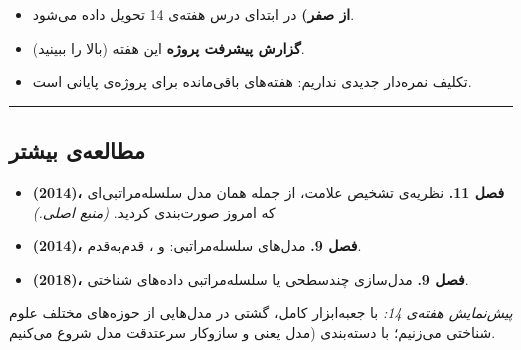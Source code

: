 \begin{itemize}
\tightlist
\item
  \textbf{ از صفر)} در ابتدای درس هفته‌ی 14 تحویل داده
  می‌شود.
\item
  \textbf{گزارش پیشرفت پروژه} این هفته (بالا را ببینید).
\item
  تکلیف نمره‌دار جدیدی نداریم: هفته‌های باقی‌مانده برای پروژه‌ی پایانی است.
\end{itemize}

\begin{center}\rule{0.5\linewidth}{0.5pt}\end{center}

\subsection{مطالعه‌ی بیشتر}

\begin{itemize}
\tightlist
\item
  \textbf{ \lr{\&}  (2014)، فصل 11.} نظریه‌ی تشخیص
  علامت، از جمله همان مدل  سلسله‌مراتبی‌ای که امروز صورت‌بندی
  کردید. \emph{(منبع اصلی.)}
\item
  \textbf{ (2014)، فصل 9.} مدل‌های سلسله‌مراتبی:  و ، قدم‌به‌قدم.
\item
  \textbf{ \lr{\&}  (2018)، فصل 9.} مدل‌سازی
  چندسطحی یا سلسله‌مراتبی داده‌های شناختی.
\end{itemize}

\emph{پیش‌نمایش هفته‌ی 14:} با جعبه‌ابزار کامل، گشتی در مدل‌هایی از حوزه‌های
مختلف علوم شناختی می‌زنیم؛ با دسته‌بندی (مدل  یعنی 
و سازوکار سرعت\lr{--}دقت مدل  شروع می‌کنیم.
